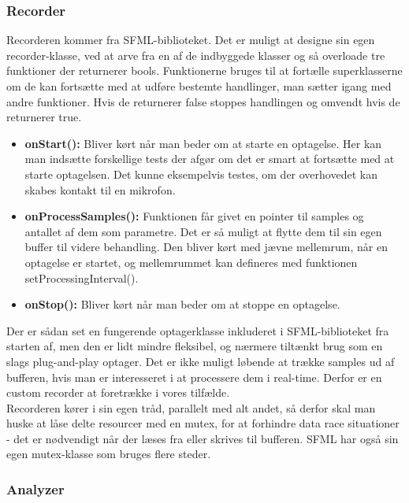 \subsubsection{Recorder}

Recorderen kommer fra SFML-biblioteket. Det er muligt at designe sin egen recorder-klasse, ved at arve fra en af de indbyggede klasser og så overloade tre funktioner der returnerer bools. Funktionerne bruges til at fortælle superklasserne om de kan fortsætte med at udføre bestemte handlinger, man sætter igang med andre funktioner. Hvis de returnerer false stoppes handlingen og omvendt hvis de returnerer true.

\begin{itemize}

\item \textbf{onStart():} Bliver kørt når man beder om at starte en optagelse. Her kan man indsætte forskellige tests der afgør om det er smart at fortsætte med at starte optagelsen. Det kunne eksempelvis testes, om der overhovedet kan skabes kontakt til en mikrofon.

\item \textbf{onProcessSamples():} Funktionen får givet en pointer til samples og antallet af dem som parametre. Det er så muligt at flytte dem til sin egen buffer til videre behandling. Den bliver kørt med jævne mellemrum, når en optagelse er startet, og mellemrummet kan defineres med funktionen setProcessingInterval(). 

\item \textbf{onStop():} Bliver kørt når man beder om at stoppe en optagelse.

\end{itemize}

Der er sådan set en fungerende optagerklasse inkluderet i SFML-biblioteket fra starten af, men den er lidt mindre fleksibel, og nærmere tiltænkt brug som en slags plug-and-play optager. Det er ikke muligt løbende at trække samples ud af bufferen, hvis man er interesseret i at processere dem i real-time. Derfor er en custom recorder at foretrække i vores tilfælde. \\
Recorderen kører i sin egen tråd, parallelt med alt andet, så derfor skal man huske at låse delte resourcer med en mutex, for at forhindre data race situationer - det er nødvendigt når der læses fra eller skrives til bufferen. SFML har også sin egen mutex-klasse som bruges flere steder.

\subsubsection{Analyzer}

